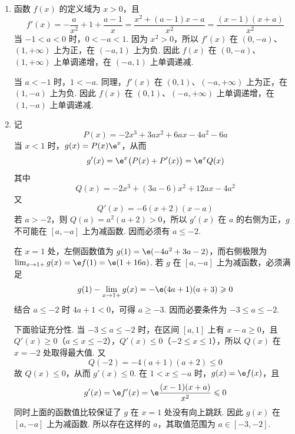 \begin{solution}
\begin{enumerate}
\item 函数 \(f(x)\) 的定义域为 \(x>0\)，且
\[
f'(x)=-\frac{a}{x^2}+1+\frac{a-1}{x}=\frac{x^2+(a-1)x-a}{x^2}=\frac{(x-1)(x+a)}{x^2}
\]
当 \(-1<a<0\) 时，\(0<-a<1\). 因为 \(x^2>0\)，所以 \(f'(x)\) 在 \((0,-a)\)、\((1,+\infty)\) 上为正，在 \((-a,1)\) 上为负. 因此 \(f(x)\) 在 \((0,-a)\)、\((1,+\infty)\) 上单调递增，在 \((-a,1)\) 上单调递减.

当 \(a<-1\) 时，\(1<-a\). 同理，\(f'(x)\) 在 \((0,1)\)、\((-a,+\infty)\) 上为正，在 \((1,-a)\) 上为负. 因此 \(f(x)\) 在 \((0,1)\)、\((-a,+\infty)\) 上单调递增，在 \((1,-a)\) 上单调递减.
\item 记
\[
P(x)=-2x^3+3ax^2+6ax-4a^2-6a
\]
当 \(x<1\) 时，\(g(x)=P(x)\e^x\)，从而
\[
g'(x)=\e^x\bigl(P(x)+P'(x)\bigr)=\e^xQ(x)
\]
其中
\[
Q(x)=-2x^3+(3a-6)x^2+12ax-4a^2
\]
又
\[
Q'(x)=-6(x+2)(x-a)
\]
若 \(a>-2\)，则 \(Q(a)=a^2(a+2)>0\)，所以 \(g'(x)\) 在 \(a\) 的右侧为正，\(g\) 不可能在 \([a,-a]\) 上为减函数. 因而必须有 \(a\leqslant-2\).

在 \(x=1\) 处，左侧函数值为 \(g(1)=\e(-4a^2+3a-2)\)，而右侧极限为 \(\lim_{x\to1+}g(x)=\e f(1)=\e(1+16a)\). 若 \(g\) 在 \([a,-a]\) 上为减函数，必须满足
\[
g(1)-\lim_{x\to1+}g(x)=-\e(4a+1)(a+3)\geqslant0
\]
结合 \(a\leqslant-2\) 时 \(4a+1<0\)，可得 \(a\geqslant-3\). 因而必要条件为 \(-3\leqslant a\leqslant-2\).

下面验证充分性. 当 \(-3\leqslant a\leqslant-2\) 时，在区间 \([a,1]\) 上有 \(x-a\geqslant0\)，且 \(Q'(x)\geqslant0\)（\(a\leqslant x\leqslant-2\)），\(Q'(x)\leqslant0\)（\(-2\leqslant x\leqslant1\)），所以 \(Q(x)\) 在 \(x=-2\) 处取得最大值. 又
\[
Q(-2)=-4(a+1)(a+2)\leqslant0
\]
故 \(Q(x)\leqslant0\)，从而 \(g'(x)\leqslant0\). 在 \(1<x\leqslant-a\) 时，\(g(x)=\e f(x)\)，且
\[
g'(x)=\e f'(x)=\e\frac{(x-1)(x+a)}{x^2}\leqslant0
\]
同时上面的函数值比较保证了 \(g\) 在 \(x=1\) 处没有向上跳跃. 因此 \(g(x)\) 在 \([a,-a]\) 上为减函数. 所以存在这样的 \(a\)，其取值范围为 \(a\in[-3,-2]\).
\end{enumerate}
\end{solution}
